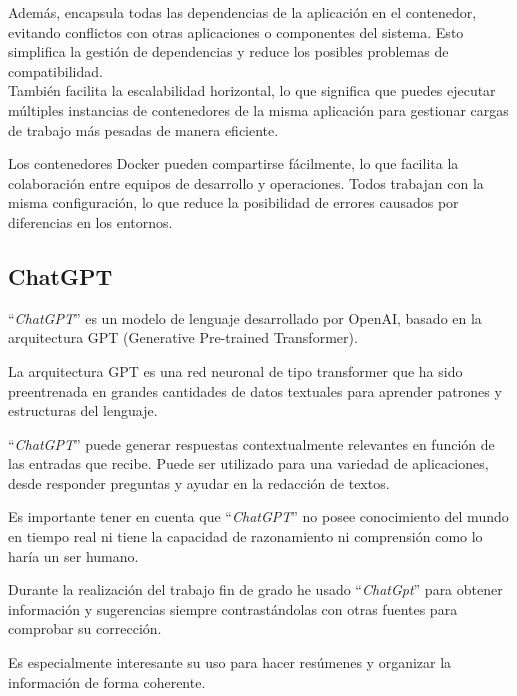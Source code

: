 Además, encapsula todas las dependencias de la aplicación en el contenedor, 
evitando conflictos con otras aplicaciones o componentes del sistema. 
Esto simplifica la gestión de dependencias y reduce los posibles problemas de compatibilidad. \\
También facilita la escalabilidad horizontal, lo que significa que puedes 
ejecutar múltiples instancias de contenedores de la misma aplicación para 
gestionar cargas de trabajo más pesadas de manera eficiente.

Los contenedores Docker pueden compartirse fácilmente, lo que facilita la colaboración 
entre equipos de desarrollo y operaciones. 
Todos trabajan con la misma configuración, lo que reduce la posibilidad de errores 
causados por diferencias en los entornos.

\subsection{ChatGPT~\cite{chatgpt1}}
``\emph{ChatGPT}'' es un modelo de lenguaje desarrollado por OpenAI, 
basado en la arquitectura GPT (Generative Pre-trained Transformer). 

La arquitectura GPT es una red neuronal de tipo transformer que ha sido 
preentrenada en grandes cantidades de datos textuales para aprender patrones y 
estructuras del lenguaje.

``\emph{ChatGPT}'' puede generar respuestas contextualmente relevantes en función de las 
entradas que recibe. Puede ser utilizado para una variedad de aplicaciones, 
desde responder preguntas y ayudar en la redacción de textos.

Es importante tener en cuenta que ``\emph{ChatGPT}'' no posee conocimiento del mundo 
en tiempo real ni tiene la capacidad de razonamiento 
ni comprensión como lo haría un ser humano.

Durante la realización del trabajo fin de grado he usado ``\emph{ChatGpt}'' para obtener 
información y sugerencias siempre contrastándolas con otras fuentes para comprobar 
su corrección.

Es especialmente interesante su uso para hacer resúmenes y organizar la información 
de forma coherente.
